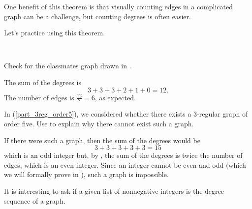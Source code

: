 One benefit of this theorem is that visually counting edges in a complicated graph can be a challenge, but counting degrees is often easier. 

Let's practice using this theorem.

\begin{exam}
\label{exam_check_first_thm_graph_thy}
~
    \begin{apart} 
        \item Check  for the classmates graph drawn in .
            \begin{soln}
                The sum of the degrees is 
                    $$3+3+3+2+1+0 = 12.$$             
                The number of edges is $\frac{12}{2}=6$, as expected.
            \end{soln}
        \item In  (\ref{part_3reg_order5}), we considered whether there exists a 3-regular graph of order five.  Use  to explain why there cannot exist such a graph.
            \begin{soln}
                If there were such a graph, then the sum of the degrees would be $$3+3+3+3+3 = 15$$ which is an odd integer but, by , the sum of the degrees is twice the number of edges, which is an even integer.  Since an integer cannot be even and odd (which we will formally prove in ), such a graph is impossible.  %
            \end{soln}  
        \end{apart}
\end{exam}

It is interesting to ask if a given list of nonnegative integers is the degree sequence of a graph.

